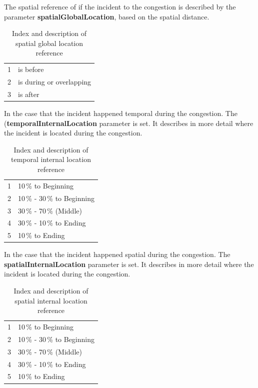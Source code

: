 The spatial reference of if the incident to the congestion is described by the parameter \textbf{spatialGlobalLocation}, based on the spatial distance.
\noindent
\begin{table}[ht]
	\centering
	\begin{tabular}{c|l}  
		1 & is before \\ 
 		2 & is during or overlapping \\ 
 		3 & is after \\ 
	\end{tabular}
	\caption{Index and description of spatial global location reference}
\end{table}

In the case that the incident happened temporal  during the congestion. The (\textbf{temporalInternalLocation} parameter is set. It describes in more detail where the incident is located during the congestion.
\noindent
\begin{table}[ht]
	\centering
	\begin{tabular}{c|l}  
		1 & 10\,\% to Beginning \\
 		2 & 10\,\% - 30\,\% to Beginning \\
 		3 & 30\,\% - 70\,\% (Middle) \\
 		4 & 30\,\% - 10\,\% to Ending \\
 		5 & 10\,\% to Ending \\
	\end{tabular}
	\caption{Index and description of temporal internal location reference}
\end{table}

In the case that the incident happened spatial during the congestion. The \textbf{spatialInternalLocation} parameter is set. It describes in more detail where the incident is located during the congestion.
\noindent
\begin{table}[ht]
	\centering
	\begin{tabular}{c|l}  
		1 & 10\,\% to Beginning \\
 		2 & 10\,\% - 30\,\% to Beginning \\
 		3 & 30\,\% - 70\,\% (Middle) \\
 		4 & 30\,\% - 10\,\% to Ending \\
 		5 & 10\,\% to Ending \\
	\end{tabular}
	\caption{Index and description of spatial internal location reference}
\end{table}
    
